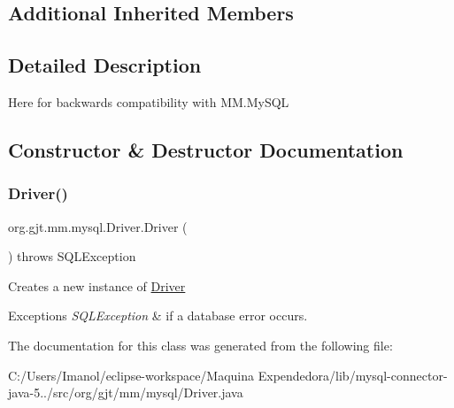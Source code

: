 \subsection*{Additional Inherited Members}


\subsection{Detailed Description}
Here for backwards compatibility with M\+M.\+My\+S\+QL 

\subsection{Constructor \& Destructor Documentation}
\mbox{\label{classorg_1_1gjt_1_1mm_1_1mysql_1_1_driver_a91faf4f04cf928601187428b4d12a026}} 
\subsubsection{\texorpdfstring{Driver()}{Driver()}}
{\footnotesize\ttfamily org.\+gjt.\+mm.\+mysql.\+Driver.\+Driver (\begin{DoxyParamCaption}{ }\end{DoxyParamCaption}) throws S\+Q\+L\+Exception}

Creates a new instance of \mbox{\hyperlink{classorg_1_1gjt_1_1mm_1_1mysql_1_1_driver}{Driver}}


\begin{DoxyExceptions}{Exceptions}
{\em S\+Q\+L\+Exception} & if a database error occurs. \\
\hline
\end{DoxyExceptions}


The documentation for this class was generated from the following file\+:\begin{DoxyCompactItemize}
\item 
C\+:/\+Users/\+Imanol/eclipse-\/workspace/\+Maquina Expendedora/lib/mysql-\/connector-\/java-\/5../src/org/gjt/mm/mysql/Driver.\+java\end{DoxyCompactItemize}
